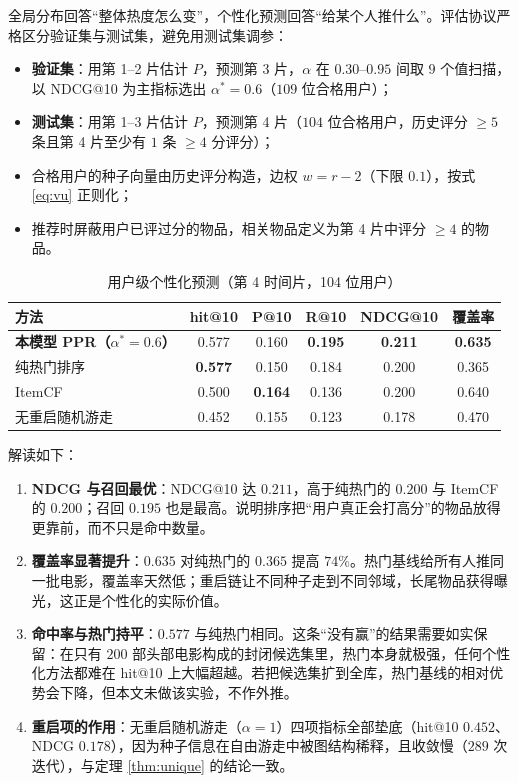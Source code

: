 \documentclass[12pt,a4paper]{ctexart}
\begin{document}
全局分布回答“整体热度怎么变”，个性化预测回答“给某个人推什么”。评估协议严格区分验证集与测试集，避免用测试集调参：

\begin{itemize}[leftmargin=1.6em]
\item \textbf{验证集}：用第 1--2 片估计 $P$，预测第 3 片，$\alpha$ 在 $0.30$--$0.95$ 间取 $9$ 个值扫描，以 NDCG@10 为主指标选出 $\alpha^*=0.6$（$109$ 位合格用户）；
\item \textbf{测试集}：用第 1--3 片估计 $P$，预测第 4 片（$104$ 位合格用户，历史评分 $\ge5$ 条且第 4 片至少有 $1$ 条 $\ge4$ 分评分）；
\item 合格用户的种子向量由历史评分构造，边权 $w=r-2$（下限 $0.1$），按式 \eqref{eq:vu} 正则化；
\item 推荐时屏蔽用户已评过分的物品，相关物品定义为第 4 片中评分 $\ge4$ 的物品。
\end{itemize}

\begin{table}[H]
\centering
\caption{用户级个性化预测（第 4 时间片，104 位用户）}
\label{tab:user}
\small
\begin{tabular}{lccccc}
\toprule
方法 & hit@10 & P@10 & R@10 & NDCG@10 & 覆盖率 \\
\midrule
\textbf{本模型 PPR（$\alpha^*=0.6$）} & 0.577 & 0.160 & \textbf{0.195} & \textbf{0.211} & \textbf{0.635} \\
纯热门排序 & \textbf{0.577} & 0.150 & 0.184 & 0.200 & 0.365 \\
ItemCF & 0.500 & \textbf{0.164} & 0.136 & 0.200 & 0.640 \\
无重启随机游走 & 0.452 & 0.155 & 0.123 & 0.178 & 0.470 \\
\bottomrule
\end{tabular}
\end{table}

解读如下：

\begin{enumerate}[label=(\arabic*),leftmargin=2.2em]
\item \textbf{NDCG 与召回最优}：NDCG@10 达 $0.211$，高于纯热门的 $0.200$ 与 ItemCF 的 $0.200$；召回 $0.195$ 也是最高。说明排序把“用户真正会打高分”的物品放得更靠前，而不只是命中数量。
\item \textbf{覆盖率显著提升}：$0.635$ 对纯热门的 $0.365$ 提高 $74\%$。热门基线给所有人推同一批电影，覆盖率天然低；重启链让不同种子走到不同邻域，长尾物品获得曝光，这正是个性化的实际价值。
\item \textbf{命中率与热门持平}：$0.577$ 与纯热门相同。这条“没有赢”的结果需要如实保留：在只有 $200$ 部头部电影构成的封闭候选集里，热门本身就极强，任何个性化方法都难在 hit@10 上大幅超越。若把候选集扩到全库，热门基线的相对优势会下降，但本文未做该实验，不作外推。
\item \textbf{重启项的作用}：无重启随机游走（$\alpha=1$）四项指标全部垫底（hit@10 $0.452$、NDCG $0.178$），因为种子信息在自由游走中被图结构稀释，且收敛慢（$289$ 次迭代），与定理 \ref{thm:unique} 的结论一致。
\end{enumerate}
\end{document}
